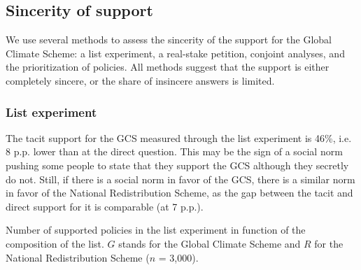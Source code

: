 \subsection{Sincerity of support}

We use several methods to assess the sincerity of the support for the Global Climate Scheme: a list experiment, a real-stake petition, conjoint analyses, and the prioritization of policies. All methods suggest that the support is either completely sincere, or the share of insincere answers is limited. 

\subsubsection{List experiment}  %
The tacit support for the GCS measured through the list experiment is 46\%, i.e. 8 p.p. lower than at the direct question. This may be the sign of a social norm pushing some people to state that they support the GCS although they secretly do not. Still, if there is a social norm in favor of the GCS, there is a similar norm in favor of the National Redistribution Scheme, as the gap between the tacit and direct support for it is comparable (at 7 p.p.). %

\begin{table}[h]\label{tab:list_exp}
  \caption{Number of supported policies in the list experiment in function of the composition of the list. $G$ stands for the Global Climate Scheme and $R$ for the National Redistribution Scheme ($n$ = 3,000).} %
  \makebox[\textwidth][c]{}
\end{table}

